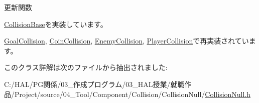 更新関数 



\mbox{\hyperlink{class_collision_base_a0f967cf5de4178ee99f434c3ff4f16fd}{Collision\+Base}}を実装しています。



\mbox{\hyperlink{class_goal_collision_a1e3995dc2f5ba2678580d06699ca6936}{Goal\+Collision}}, \mbox{\hyperlink{class_coin_collision_a981fd9b1b8c688a757a456a56d80501b}{Coin\+Collision}}, \mbox{\hyperlink{class_enemy_collision_ab54133504d867c6d2070d2f3854a0aaf}{Enemy\+Collision}}, \mbox{\hyperlink{class_player_collision_a09f97f220903f5724a3af6b97af3a336}{Player\+Collision}}で再実装されています。



このクラス詳解は次のファイルから抽出されました\+:\begin{DoxyCompactItemize}
\item 
C\+:/\+H\+A\+L/\+P\+G関係/03\+\_\+作成プログラム/03\+\_\+\+H\+A\+L授業/就職作品/\+Project/source/04\+\_\+\+Tool/\+Component/\+Collision/\+Collision\+Null/\mbox{\hyperlink{_collision_null_8h}{Collision\+Null.\+h}}\end{DoxyCompactItemize}
